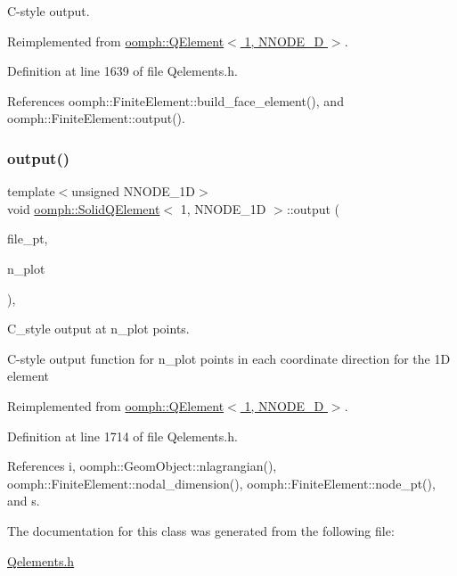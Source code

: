 C-\/style output. 



Reimplemented from \hyperlink{classoomph_1_1QElement_3_011_00_01NNODE__1D_01_4_a54d62722411a1b5361718aa95f6c4e70}{oomph\+::\+Q\+Element$<$ 1, N\+N\+O\+D\+E\+\_\+D $>$}.



Definition at line 1639 of file Qelements.\+h.



References oomph\+::\+Finite\+Element\+::build\+\_\+face\+\_\+element(), and oomph\+::\+Finite\+Element\+::output().

\mbox{\label{classoomph_1_1SolidQElement_3_011_00_01NNODE__1D_01_4_aee559383965b0581c287e10d6278050e}} 
\subsubsection{\texorpdfstring{output()}{output()}\hspace{0.1cm}{\footnotesize\ttfamily [4/4]}}
{\footnotesize\ttfamily template$<$unsigned N\+N\+O\+D\+E\+\_\+1D$>$ \\
void \hyperlink{classoomph_1_1SolidQElement}{oomph\+::\+Solid\+Q\+Element}$<$ 1, N\+N\+O\+D\+E\+\_\+1D $>$\+::output (\begin{DoxyParamCaption}\item[{F\+I\+LE $\ast$}]{file\+\_\+pt,  }\item[{const unsigned \&}]{n\+\_\+plot }\end{DoxyParamCaption})\hspace{0.3cm}{\ttfamily [inline]}, {\ttfamily [virtual]}}



C\+\_\+style output at n\+\_\+plot points. 

C-\/style output function for n\+\_\+plot points in each coordinate direction for the 1D element 

Reimplemented from \hyperlink{classoomph_1_1QElement_3_011_00_01NNODE__1D_01_4_a5ba26a038a5a26e6873753fb78cd6a5c}{oomph\+::\+Q\+Element$<$ 1, N\+N\+O\+D\+E\+\_\+D $>$}.



Definition at line 1714 of file Qelements.\+h.



References i, oomph\+::\+Geom\+Object\+::nlagrangian(), oomph\+::\+Finite\+Element\+::nodal\+\_\+dimension(), oomph\+::\+Finite\+Element\+::node\+\_\+pt(), and s.



The documentation for this class was generated from the following file\+:\begin{DoxyCompactItemize}
\item 
\hyperlink{Qelements_8h}{Qelements.\+h}\end{DoxyCompactItemize}
